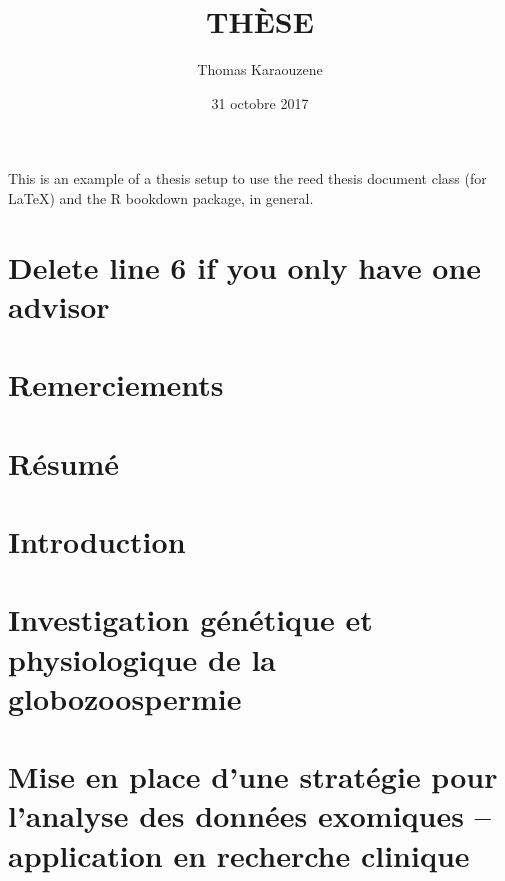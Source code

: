 \documentclass[12pt,twoside]{reedthesis}
\title{THÈSE}
\author{Thomas Karaouzene}
\date{31 octobre 2017}
\theoremstyle{definition}
\theoremstyle{definition}
\theoremstyle{remark}
\begin{document}
      \maketitle
  
  \frontmatter %
  \pagestyle{empty} %

  
      \begin{preface}
      This is an example of a thesis setup to use the reed thesis document
      class (for LaTeX) and the R bookdown package, in general.
    \end{preface}
  
      \hypersetup{linkcolor=black}
    \setcounter{tocdepth}{3}
    \tableofcontents
  
      \listoftables
  
      \listoffigures
  
  
  
  \mainmatter %
  \pagestyle{fancyplain} %

  \chapter{Delete line 6 if you only have one
  advisor}\label{delete-line-6-if-you-only-have-one-advisor}
  
  \chapter*{Remerciements}\label{remerciements}
  
  \chapter*{Résumé}\label{resume}
  
  \chapter{Introduction}\label{introInf}
  
  \chapter{Investigation génétique et physiologique de la
  globozoospermie}\label{globo}
  
  \chapter{Mise en place d'une stratégie pour l'analyse des données
  exomiques -- application en recherche
  clinique}\label{mise-en-place-dune-strategie-pour-lanalyse-des-donnees-exomiques-application-en-recherche-clinique}
  
\end{document}
